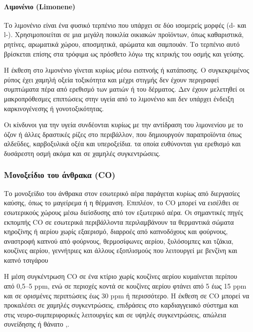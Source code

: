 \paragraph {Λιμονένιο (Limonene)}

Το λιμονένιο είναι ένα φυσικό τερπένιο που υπάρχει σε δύο ισομερείς μορφές (d- και l-). Χρησιμοποιείται σε μια μεγάλη ποικιλία οικιακών προϊόντων, όπως καθαριστικά, ρητίνες, αρωματικά χώρου, αποσμητικά, αρώματα και σαμπουάν. 
Το τερπένιο αυτό βρίσκεται επίσης στα τρόφιμα ως πρόσθετο λόγω της κιτρικής του οσμής και γεύσης.

Η έκθεση στο λιμονένιο γίνεται κυρίως μέσω εισπνοής ή κατάποσης. Ο συγκεκριμένος ρύπος έχει χαμηλή οξεία τοξικότητα και μέχρι στιγμής δεν έχουν περιγραφεί συμπτώματα πέρα από ερεθισμό των ματιών ή του δέρματος. 
Δεν έχουν μελετηθεί οι μακροπρόθεσμες επιπτώσεις στην υγεία από το λιμονένιο και δεν υπάρχει ένδειξη καρκινογένεσης ή γονοτοξικότητας. 

Οι κίνδυνοι για την υγεία συνδέονται κυρίως με την αντίδραση του λιμονενίου με το όζον ή άλλες δραστικές ρίζες στο περιβάλλον, που δημιουργούν παραπροϊόντα όπως αλδεΰδες, καρβοξυλικά οξέα και υπεροξείδια.
τα οποία ευθύνονται για ερεθισμό και δυσάρεστη οσμή ακόμα και σε χαμηλές συγκεντρώσεις.


\subsubsection{Μονοξείδιο του άνθρακα (CO)}
Το μονοξείδιο του άνθρακα στον εσωτερικό αέρα παράγεται κυρίως από διεργασίες καύσης, όπως το μαγείρεμα ή η θέρμανση. Επιπλέον, το CO μπορεί να εισέλθει σε εσωτερικούς χώρους μέσω διείσδυσης από τον εξωτερικό αέρα. 
Οι σημαντικές πηγές εκπομπής CO σε εσωτερικά περιβάλλοντα περιλαμβάνουν τα θερμαντικά σώματα κηροζίνης ή αερίου χωρίς εξαερισμό, διαρροές από καπνοδόχους και φούρνους, αναστροφή καπνού από φούρνους, θερμοσίφωνες αερίου, ξυλόσομπες και τζάκια,
κουζίνες αερίου, γεννήτριες και άλλους εξοπλισμούς που λειτουργεί με βενζίνη και καπνό τσιγάρου

Η μέση συγκέντρωση CO σε ένα κτίριο χωρίς κουζίνες αερίου κυμαίνεται περίπου από 0,5–5 ppm, ενώ σε περιοχές κοντά σε κουζίνες αερίου φτάνει από 5 έως 15 ppm και σε ορισμένες περιπτώσεις έως 30 ppm ή περισσότερο. 
Η έκθεση σε CO μπορεί να προκαλέσει σε χαμηλές συγκεντρώσεις, επιδράσεις στο καρδιαγγειακό σύστημα και στις νευρο-συμπεριφορικές λειτουργίες και σε υψηλές συγκεντρώσεις, απώλεια συνείδησης ή θάνατο \cite{Raub20001},\cite{ijerph17082927}.



